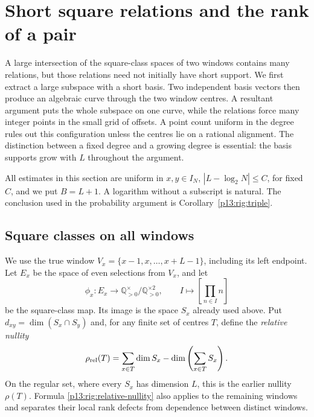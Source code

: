 \section{Short square relations and the rank of a pair}
\label{p13:rig:section}

A large intersection of the square-class spaces of two windows
contains many relations, but those relations need not initially have
short support.  We first extract a large subspace with a short basis.
Two independent basis vectors then produce an algebraic curve through
the two window centres.  A resultant argument puts the whole subspace
on one curve, while the relations force many integer points in the
small grid of offsets.  A point count uniform in the degree rules out
this configuration unless the centres lie on a rational alignment.
The distinction between a fixed degree and a growing degree is
essential: the basis supports grow with $L$ throughout the argument.

All estimates in this section are uniform in
$x,y\in I_N$, $|L-\log_2N|\le C$, for fixed $C$, and we put
$B=L+1$.  A logarithm without a subscript is natural.
The conclusion used in the probability argument is
Corollary~\ref{p13:rig:triple}.

\subsection{Square classes on all windows}
\label{p13:rig:notation}

We use the true window
$V_x=\{x-1,x,\ldots,x+L-1\}$, including its left endpoint.
Let $E_x$ be the space of even selections from $V_x$, and let
\[
 \phi_x:E_x\longrightarrow
 \mathbb Q_{>0}^{\times}/\mathbb Q_{>0}^{\times2},
 \qquad I\longmapsto\left[\prod_{n\in I}n\right]
\]
be the square-class map.  Its image is the space $S_x$ already used
above.  Put $d_{xy}=\dim(S_x\cap S_y)$ and, for any finite set of
centres $T$, define the \emph{relative nullity}
\begin{equation}
 \rho_{\rm rel}(T)=\sum_{x\in T}\dim S_x-
                         \dim\left(\sum_{x\in T}S_x\right).
 \label{p13:rig:relative-nullity}
\end{equation}
On the regular set, where every $S_x$ has dimension $L$, this is
the earlier nullity $\rho(T)$.  Formula
\eqref{p13:rig:relative-nullity} also applies to the remaining
windows and separates their local rank defects from dependence
between distinct windows.

